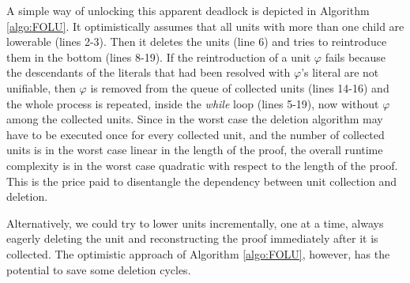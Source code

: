 A simple way of unlocking this apparent deadlock is depicted in Algorithm \ref{algo:FOLU}. It optimistically assumes that all units with more than one child are lowerable (lines 2-3). Then it deletes the units (line 6) and tries to reintroduce them in the bottom (lines 8-19). If the reintroduction of a unit $\varphi$ fails because the descendants of the literals that had been resolved with $\varphi$'s literal are not unifiable, then $\varphi$ is removed from the queue of collected units (lines 14-16) and the whole process is repeated, inside the \emph{while} loop (lines 5-19), now without $\varphi$ among the collected units. Since in the worst case the deletion algorithm may have to be executed once for every collected unit, and the number of collected units is in the worst case linear in the length of the proof, the overall runtime complexity is in the worst case quadratic with respect to the length of the proof. This is the price paid to disentangle the dependency between unit collection and deletion.

Alternatively, we could try to lower units incrementally, one at a time, always eagerly deleting the unit and reconstructing the proof immediately after it is collected. The optimistic approach of Algorithm \ref{algo:FOLU}, however, has the potential to save some deletion cycles.




